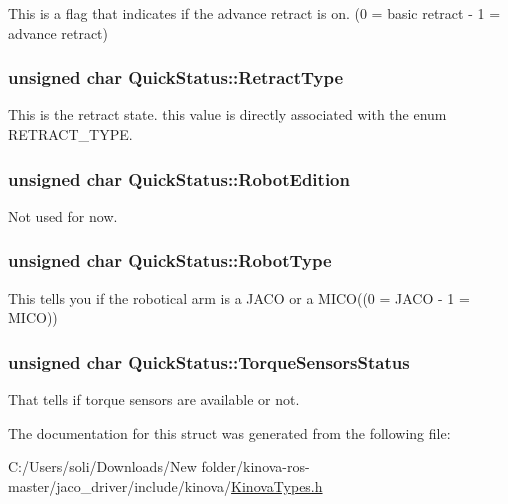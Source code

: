 This is a flag that indicates if the advance retract is on. (0 = basic retract -\/ 1 = advance retract) 

\subsubsection[{\texorpdfstring{Retract\+Type}{RetractType}}]{\setlength{\rightskip}{0pt plus 5cm}unsigned char Quick\+Status\+::\+Retract\+Type}\hypertarget{struct_quick_status_a720df4ba846103ada466a72dd8d28142}{}\label{struct_quick_status_a720df4ba846103ada466a72dd8d28142}


This is the retract state. this value is directly associated with the enum R\+E\+T\+R\+A\+C\+T\+\_\+\+T\+Y\+PE. 

\subsubsection[{\texorpdfstring{Robot\+Edition}{RobotEdition}}]{\setlength{\rightskip}{0pt plus 5cm}unsigned char Quick\+Status\+::\+Robot\+Edition}\hypertarget{struct_quick_status_a966ce09dd5f19aaeea7edf9aff76d6d8}{}\label{struct_quick_status_a966ce09dd5f19aaeea7edf9aff76d6d8}


Not used for now. 

\subsubsection[{\texorpdfstring{Robot\+Type}{RobotType}}]{\setlength{\rightskip}{0pt plus 5cm}unsigned char Quick\+Status\+::\+Robot\+Type}\hypertarget{struct_quick_status_a74b2c900b935a07df18fbea12c3f4d68}{}\label{struct_quick_status_a74b2c900b935a07df18fbea12c3f4d68}


This tells you if the robotical arm is a J\+A\+CO or a M\+I\+CO((0 = J\+A\+CO -\/ 1 = M\+I\+CO)) 

\subsubsection[{\texorpdfstring{Torque\+Sensors\+Status}{TorqueSensorsStatus}}]{\setlength{\rightskip}{0pt plus 5cm}unsigned char Quick\+Status\+::\+Torque\+Sensors\+Status}\hypertarget{struct_quick_status_a7281937d476103ff28398205848897f1}{}\label{struct_quick_status_a7281937d476103ff28398205848897f1}
That tells if torque sensors are available or not. 

The documentation for this struct was generated from the following file\+:\begin{DoxyCompactItemize}
\item 
C\+:/\+Users/soli/\+Downloads/\+New folder/kinova-\/ros-\/master/jaco\+\_\+driver/include/kinova/\hyperlink{_kinova_types_8h}{Kinova\+Types.\+h}\end{DoxyCompactItemize}
